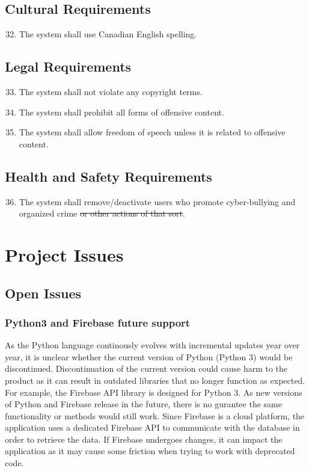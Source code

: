 \documentclass[12pt, titlepage]{article}
\begin{document}
\subsection{Cultural Requirements}
    \begin{enumerate}
    \setcounter{enumi}{31}
        \item The system shall use Canadian English spelling.
    \end{enumerate}
\subsection{Legal Requirements}
        \begin{enumerate}
    \setcounter{enumi}{32}
        \item The system shall not violate any copyright terms.
        \item The system shall prohibit all forms of offensive content.
        \item The system shall allow freedom of speech unless it is related to offensive content.
    \end{enumerate}
\subsection{Health and Safety Requirements}
        \begin{enumerate}
    \setcounter{enumi}{35}
        \item The system shall remove/deactivate users who promote cyber-bullying and organized crime \sout{or other actions of that sort}.
    \end{enumerate}


\section{Project Issues}

\subsection{Open Issues}
\subsubsection{Python3 and Firebase future support}
As the Python language continously evolves with incremental updates year over year, it is unclear whether the current version of Python (Python 3) would be discontinued. Discontinuation of the current version could cause harm to the product as it can result in outdated libraries that no longer function as expected. For example, the Firebase API library is designed for Python 3. As new versions of Python and Firebase release in the future, there is no gurantee the same functionality or methods would still work. Since Firebase is a cloud platform, the application uses a dedicated Firebase API to communicate with the database in order to retrieve the data. If Firebase undergoes changes, it can impact the application as it may cause some friction when trying to work with deprecated code.
\end{document}
